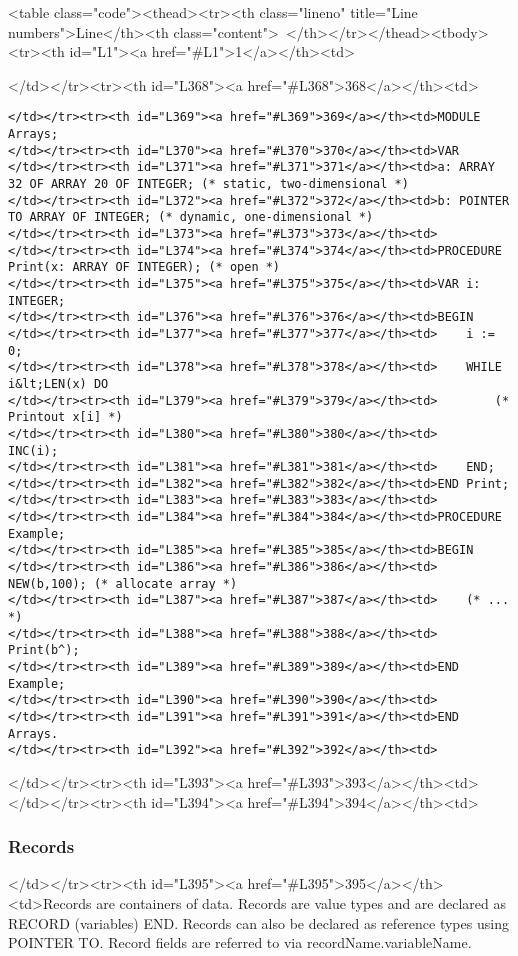 <table class="code"><thead><tr><th class="lineno" title="Line numbers">Line</th><th class="content"> </th></tr></thead><tbody><tr><th id="L1"><a href="#L1">1</a></th><td>\documentclass[a4paper,11pt]{article}
\begin{document}
</td></tr><tr><th id="L368"><a href="#L368">368</a></th><td>\begin{lstlisting}[language=Oberon,frame=none,caption=Using arrays]
</td></tr><tr><th id="L369"><a href="#L369">369</a></th><td>MODULE Arrays;
</td></tr><tr><th id="L370"><a href="#L370">370</a></th><td>VAR
</td></tr><tr><th id="L371"><a href="#L371">371</a></th><td>a: ARRAY 32 OF ARRAY 20 OF INTEGER; (* static, two-dimensional *)
</td></tr><tr><th id="L372"><a href="#L372">372</a></th><td>b: POINTER TO ARRAY OF INTEGER; (* dynamic, one-dimensional *)
</td></tr><tr><th id="L373"><a href="#L373">373</a></th><td>
</td></tr><tr><th id="L374"><a href="#L374">374</a></th><td>PROCEDURE Print(x: ARRAY OF INTEGER); (* open *)
</td></tr><tr><th id="L375"><a href="#L375">375</a></th><td>VAR i: INTEGER;
</td></tr><tr><th id="L376"><a href="#L376">376</a></th><td>BEGIN
</td></tr><tr><th id="L377"><a href="#L377">377</a></th><td>    i := 0;
</td></tr><tr><th id="L378"><a href="#L378">378</a></th><td>    WHILE i&lt;LEN(x) DO
</td></tr><tr><th id="L379"><a href="#L379">379</a></th><td>        (* Printout x[i] *)
</td></tr><tr><th id="L380"><a href="#L380">380</a></th><td>        INC(i);
</td></tr><tr><th id="L381"><a href="#L381">381</a></th><td>    END;
</td></tr><tr><th id="L382"><a href="#L382">382</a></th><td>END Print;
</td></tr><tr><th id="L383"><a href="#L383">383</a></th><td>
</td></tr><tr><th id="L384"><a href="#L384">384</a></th><td>PROCEDURE Example;
</td></tr><tr><th id="L385"><a href="#L385">385</a></th><td>BEGIN
</td></tr><tr><th id="L386"><a href="#L386">386</a></th><td>    NEW(b,100); (* allocate array *)
</td></tr><tr><th id="L387"><a href="#L387">387</a></th><td>    (* ... *)
</td></tr><tr><th id="L388"><a href="#L388">388</a></th><td>    Print(b^);
</td></tr><tr><th id="L389"><a href="#L389">389</a></th><td>END Example;
</td></tr><tr><th id="L390"><a href="#L390">390</a></th><td>
</td></tr><tr><th id="L391"><a href="#L391">391</a></th><td>END Arrays.
</td></tr><tr><th id="L392"><a href="#L392">392</a></th><td>\end{lstlisting}
</td></tr><tr><th id="L393"><a href="#L393">393</a></th><td>
</td></tr><tr><th id="L394"><a href="#L394">394</a></th><td>\subsubsection{Records}\label{section:Records}
</td></tr><tr><th id="L395"><a href="#L395">395</a></th><td>Records are containers of data. Records are value types and are declared as RECORD (variables) END. Records can also be declared as reference types using POINTER TO. Record fields are referred to via recordName.variableName.
\end{document}
